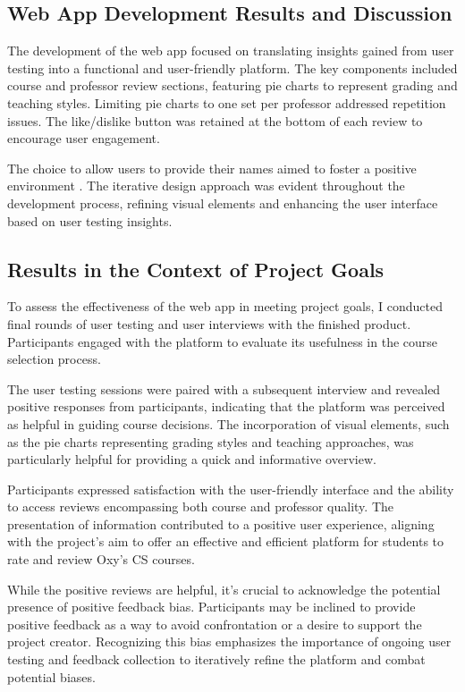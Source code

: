 \documentclass[10pt,twocolumn]{article}
\begin{document}
\subsection{Web App Development Results and Discussion}

The development of the web app focused on translating insights gained from user testing into a functional and user-friendly platform. The key components included course and professor review sections, featuring pie charts to represent grading and teaching styles. Limiting pie charts to one set per professor addressed repetition issues. The like/dislike button was retained at the bottom of each review to encourage user engagement.

The choice to allow users to provide their names aimed to foster a positive environment \cite{ellis1984}. The iterative design approach was evident throughout the development process, refining visual elements and enhancing the user interface based on user testing insights.

\subsection{Results in the Context of Project Goals}

To assess the effectiveness of the web app in meeting project goals, I conducted final rounds of user testing and user interviews with the finished product. Participants engaged with the platform to evaluate its usefulness in the course selection process.

The user testing sessions were paired with a subsequent interview and revealed positive responses from participants, indicating that the platform was perceived as helpful in guiding course decisions. The incorporation of visual elements, such as the pie charts representing grading styles and teaching approaches, was particularly helpful for providing a quick and informative overview.

Participants expressed satisfaction with the user-friendly interface and the ability to access reviews encompassing both course and professor quality. The presentation of information contributed to a positive user experience, aligning with the project's aim to offer an effective and efficient platform for students to rate and review Oxy's CS courses.

While the positive reviews are helpful, it's crucial to acknowledge the potential presence of positive feedback bias. Participants may be inclined to provide positive feedback as a way to avoid confrontation or a desire to support the project creator. Recognizing this bias emphasizes the importance of ongoing user testing and feedback collection to iteratively refine the platform and combat potential biases.
\end{document}
